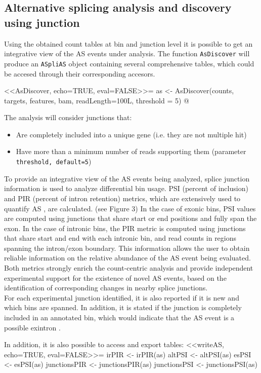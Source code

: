 \documentclass{article}
\begin{document}
\subsection{Alternative splicing analysis and discovery using junction}
Using the obtained count tables at bin and junction level it is possible to get an integrative view of the AS events under analysis. The function \texttt{AsDiscover} will produce an \texttt{ASpliAS} object containing several comprehensive tables, which could be accesed through their corresponding accesors. 



<<AsDiscover, echo=TRUE, eval=FALSE>>=
as <- AsDiscover(counts, targets, features, bam, readLength=100L, threshold = 5)
@


The analysis will consider junctions that:
\begin{itemize}
\item Are completely included into a unique gene (i.e. they are not multiple hit)
\item Have more than a minimum number of reads supporting them (parameter \texttt{threshold, default=5})
\end{itemize}

To provide  an integrative view of the AS events being analyzed, splice junction information is used to analyze differential bin usage. PSI (percent of inclusion) and PIR (percent of intron retention) metrics, which are extensively used to quantify AS \cite{pmid21057496}, are calculated.  (see Figure 3) In the case of exonic bins, PSI values are computed using junctions that share start or end positions and fully span the exon. In  the case of intronic bins, the PIR metric is computed using junctions that share start and end with each intronic bin, and read counts in regions spanning the intron/exon boundary.  This information allows the user to obtain reliable information on the relative abundance of the AS event being evaluated. Both metrics strongly enrich the count-centric analysis and provide independent experimental support for the existence of novel AS events, based on the identification of corresponding changes in nearby splice junctions.\\
For each experimental junction identified, it is also reported if it is new and which bins are spanned. In addition, it is stated if the junction is completely included in an annotated bin, which would indicate that the AS event is a possible exintron \cite{pmid25934563}. 

In addition, it is also possible to access and export tables:
<<writeAS, echo=TRUE, eval=FALSE>>=
irPIR <- irPIR(as)
altPSI <- altPSI(as)
esPSI <- esPSI(as)
junctionsPIR <- junctionsPIR(as)
junctionsPSI <- junctionsPSI(as)
\end{document}
